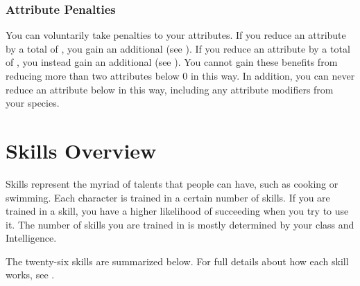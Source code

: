         \subsubsection{Attribute Penalties}\label{Attribute Penalties}
            You can voluntarily take penalties to your attributes.
            If you reduce an attribute by a total of , you gain an additional  (see ).
            If you reduce an attribute by a total of , you instead gain an additional  (see ).
            You cannot gain these benefits from reducing more than two attributes below 0 in this way.
            In addition, you can never reduce an attribute below  in this way, including any attribute modifiers from your species.

\section{Skills Overview}
    Skills represent the myriad of talents that people can have, such as cooking or swimming.
    Each character is trained in a certain number of skills.
    If you are trained in a skill, you have a higher likelihood of succeeding when you try to use it.
    The number of skills you are trained in is mostly determined by your class and Intelligence.

    The twenty-six skills are summarized below.
    For full details about how each skill works, see .

